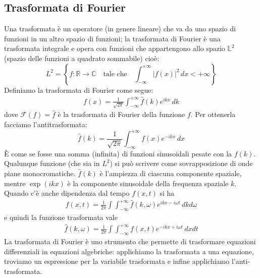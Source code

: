 \subsection{Trasformata di Fourier}
Una trasformata è un operatore (in genere lineare) che va da uno spazio di funzioni in un altro spazio di funzioni; la trasformata di Fourier è una 
trasformata integrale e opera con funzioni che appartengono allo spazio $ \mathbb{L}^2 $ (spazio delle funzioni a quadrato sommabile) cioè:
\begin{equation}
  L^2 = \left\{f:\mathbb{R} \to \mathbb{C} \quad \text{tale che} \quad \int_{-\infty}^{+\infty} |f(x)|^2 \,dx < +\infty \right\}
\end{equation}
Definiamo la trasformata di Fourier come segue:
\begin{align}
  f(x) = \frac{1}{\sqrt{2\pi}} \int_{-\infty}^{+\infty} \hat{f}(k) e^{ikx} \,dk
\end{align}
dove $ \mathcal{F}(f) = \hat{f} $ è la trasformata di Fourier della funzione $ f $. Per ottenerla facciamo l'antitrasformata:
\begin{equation}
  \hat{f}(k) = \frac{1}{\sqrt{2\pi}} \int_{-\infty}^{+\infty} f(x) e^{-ikx} \,dx
\end{equation}
È come se fosse una somma (infinita) di funzioni sinusoidali pesate con la $f(k)$.
Qualunque funzione (che sia in $ L^2 $) si può scrivere come sovrapposizione di onde piane monocromatiche. $ \hat{f}(k) $ è l'ampiezza di ciascuna 
componente spaziale, mentre $ \exp(ikx) $ è la componente sinusoidale della frequenza spaziale $ k $. Quando c'è anche dipendenza dal tempo $ f(x,t) $ si ha
\begin{align}
  f(x,t ) = \frac{1}{2\pi} \int \!\!\!\int_{-\infty}^{+\infty} \hat{f}(k,\omega) e^{ikx-i\omega t} \,dkd\omega
\end{align}
e quindi la funzione trasformata vale
\begin{align}
  \hat{f}(k,\omega) = \frac{1}{2\pi}\int\!\!\! \int_{-\infty}^{+\infty} {f}(x,t) e^{-ikx+i\omega t} \,dxdt
\end{align}
La trasformata di Fourier è uno strumento che permette di trasformare equazioni differenziali in equazioni algebriche: applichiamo la trasformata a una 
equazione, troviamo un espressione per la variabile trasformata e infine applichiamo l'anti-trasformata.

